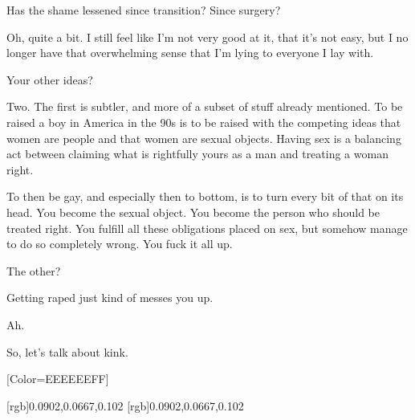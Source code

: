 \begin{paracol}{2}
\begin{leftcolumn}
\begin{ally}
Has the shame lessened since transition? Since surgery?
\end{ally}
Oh, quite a bit. I still feel like I'm not very good at it, that it's not easy, but I no longer have that overwhelming sense that I'm lying to everyone I lay with.

\begin{ally}
Your other ideas?
\end{ally}
Two. The first is subtler, and more of a subset of stuff already mentioned. To be raised a boy in America in the 90s is to be raised with the competing ideas that women are people and that women are sexual objects. Having sex is a balancing act between claiming what is rightfully yours as a man and treating a woman right.

To then be gay, and especially then to bottom, is to turn every bit of that on its head. You become the sexual object. You become the person who should be treated right. You fulfill all these obligations placed on sex, but somehow manage to do so completely wrong. You fuck it all up.

\begin{ally}
The other?
\end{ally}
Getting raped just kind of messes you up.

\begin{ally}
Ah.
\end{ally}
So, let's talk about kink.

\newpage
\end{leftcolumn}
\end{paracol}

\renewfontfamily{}[Color=EEEEEEFF]

[rgb]{0.0902,0.0667,0.102}
[rgb]{0.0902,0.0667,0.102}

